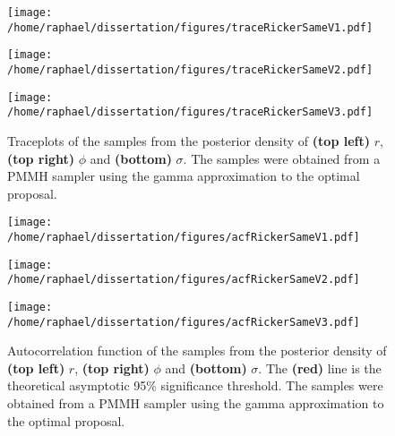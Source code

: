 \documentclass[12pt]{article}
\begin{document}
	\begin{figure}[htb]
		\centering
		\begin{minipage}{0.4\textwidth}
			\centering
			\texttt{[image: /home/raphael/dissertation/figures/traceRickerSameV1.pdf]}
		\end{minipage}
		\begin{minipage}{0.4\textwidth}
			\centering
			\texttt{[image: /home/raphael/dissertation/figures/traceRickerSameV2.pdf]}
		\end{minipage}
		\begin{minipage}{0.4\textwidth}
			\centering
			\texttt{[image: /home/raphael/dissertation/figures/traceRickerSameV3.pdf]}
		\end{minipage}
		\caption[Traceplots of a run of a PMMH sampler on data simulated from the Ricker model]{Traceplots of the samples from the posterior density of \textbf{(top left)} $r$, \textbf{(top right)} $\phi$ and \textbf{(bottom)} $\sigma$. The samples were obtained from a PMMH sampler using the gamma approximation to the optimal proposal.}
		\label{fig:traceplotDiag}
	\end{figure}
	
	\begin{figure}[htb]
		\centering
		\begin{minipage}{0.4\textwidth}
			\centering
			\texttt{[image: /home/raphael/dissertation/figures/acfRickerSameV1.pdf]}
		\end{minipage}
		\begin{minipage}{0.4\textwidth}
			\centering
			\texttt{[image: /home/raphael/dissertation/figures/acfRickerSameV2.pdf]}
		\end{minipage}
		\begin{minipage}{0.4\textwidth}
			\centering
			\texttt{[image: /home/raphael/dissertation/figures/acfRickerSameV3.pdf]}
		\end{minipage}
		\caption[Autocorrelations functions of a run of a PMMH sampler on data simulated from the Ricker model]{Autocorrelation function of the samples from the posterior density of \textbf{(top left)} $r$, \textbf{(top right)} $\phi$ and \textbf{(bottom)} $\sigma$. The \textbf{(red)} line is the theoretical asymptotic 95\% significance threshold. The samples were obtained from a PMMH sampler using the gamma approximation to the optimal proposal.}
		\label{fig:acfDiag}
	\end{figure}
	
\end{document}
